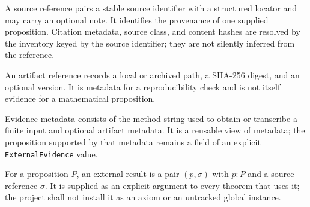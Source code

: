 \begin{definition}
  \label{def:source-ref}
  \leanok
  A source reference pairs a stable source identifier with a structured locator and
  may carry an optional note.  It identifies the provenance of one supplied
  proposition.  Citation metadata, source class, and content hashes are
  resolved by the inventory keyed by the source identifier; they are not
  silently inferred from the reference.
\end{definition}

\begin{definition}
  \label{def:artifact-ref}
  \leanok
  An artifact reference records a local or archived path, a SHA-256 digest,
  and an optional version.  It is metadata for a reproducibility check and is
  not itself evidence for a mathematical proposition.
\end{definition}

\begin{definition}
  \label{def:evidence-metadata}
  \leanok
  Evidence metadata consists of the method string used to obtain or transcribe
  a finite input and optional artifact metadata.  It is a reusable view of
  metadata; the proposition supported by that metadata remains a field of an
  explicit \texttt{ExternalEvidence} value.
\end{definition}

\begin{definition}
  \label{def:external-result}
  \leanok
  For a proposition $P$, an external result is a pair $(p,\sigma)$ with
  $p:P$ and a source reference $\sigma$.  It is supplied as an explicit
  argument to every theorem that uses it; the project shall not install it as
  an axiom or an untracked global instance.
\end{definition}

